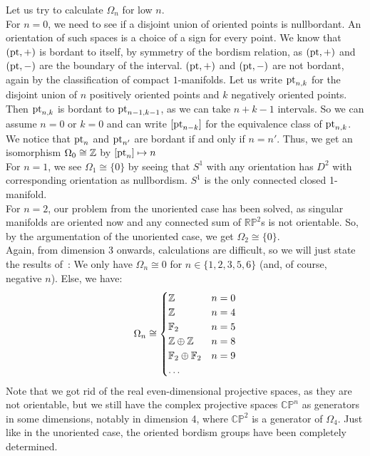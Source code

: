 \documentclass[a4paper,11pt]{article}
\begin{document}
Let us try to calculate \(\Omega_n\) for low \(n\).\\
For \(n=0\), we need to see if a disjoint union of oriented points is nullbordant. 
An orientation of such spaces is a choice of a sign for every point. 
We know that \((\mathrm{pt},+)\) is bordant to itself, by symmetry of the bordism relation, as \((\mathrm{pt},+)\) and \((\mathrm{pt},-)\) are the boundary of the interval. \((\mathrm{pt},+)\) and \((\mathrm{pt},-)\) are not bordant, again by the classification of compact \(1\)-manifolds.
Let us write \(\mathrm{pt}_{n,k}\) for the disjoint union of \(n\) positively oriented points and \(k\) negatively oriented points. 
Then \(\mathrm{pt}_{n,k}\) is bordant to \(\mathrm{pt}_{n-1,k-1}\), as we can take \(n+k-1\) intervals. So we can assume \(n=0\) or \(k=0\) and can write \([\mathrm{pt}_{n-k}]\) for the equivalence class of \(\mathrm{pt}_{n,k}\). We notice that \(\mathrm{pt}_n\) and \(\mathrm{pt}_{n'}\) are bordant if and only if \(n=n'\). 
Thus, we get an isomorphism \(\Omega_0\cong\mathbb{Z}\) by \([\mathrm{pt}_n]\mapsto n\)\\
For \(n=1\), we see \(\Omega_1\cong\{0\}\) by seeing that \(S^1\) with any orientation has \(D^2\) with corresponding orientation as nullbordism. \(S^1\) is the only connected closed 1-manifold.\\
For \(n=2\), our problem from the unoriented case has been solved, as singular manifolds are oriented now and any connected sum of \(\mathbb{RP}^2\)s is not orientable. 
So, by the argumentation of the unoriented case, we get \(\Omega_2\cong\{0\}\).\\
Again, from dimension 3 onwards, calculations are difficult, so we will just state the results of\ \cite[\S 17]{stasheff}: We only have \(\Omega_n\cong 0\) for \(n\in\{1,2,3,5,6\}\) (and, of course, negative \(n\)). Else, we have:
\[\Omega_n\cong\begin{cases}\mathbb{Z} & n=0\\
\mathbb{Z} & n=4\\
\mathbb{F}_2 & n=5\\
\mathbb{Z}\oplus\mathbb{Z} & n=8\\
\mathbb{F}_2\oplus\mathbb{F}_2 & n=9\\
\dots
\end{cases}\]
Note that we got rid of the real even-dimensional projective spaces, as they are not orientable, but we still have the complex projective spaces \(\mathbb{CP}^n\) as generators in some dimensions, notably in dimension 4, where \(\mathbb{CP}^2\) is a generator of \(\Omega_4\).
Just like in the unoriented case, the oriented bordism groups have been completely determined.
\end{document}
